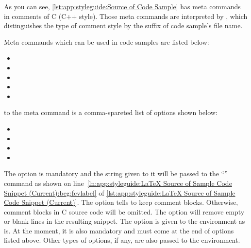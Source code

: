As you can see, \cref{lst:app:styleguide:Source of Code Sample}
has meta commands in comments of C (C++ style).
Those meta commands are interpreted by ,
which distinguishes the type of comment style by the suffix of code
sample's file name.

Meta commands which can be used in code samples are listed below:

\begin{itemize}[noitemsep]
\item {}
\item {}
\item {}
\item \co{\\fcvexclude}
\item \co{\\fcvblank}
\end{itemize}

 to the  meta command
is a comma-spareted list of options shown below:

\begin{itemize}[noitemsep]
\item {}
\item {}
\item {}
\item {}
\end{itemize}

The  option is mandatory and the string given to it
will be passed to the
``'' command as shown on
line~\ref{ln:app:styleguide:LaTeX Source of Sample Code Snippet (Current):beg:fcvlabel} of
\cref{lst:app:styleguide:LaTeX Source of Sample Code Snippet (Current)}.
The  option tells  to keep
comment blocks.
Otherwise, comment blocks in C source code will be omitted.
The  option will remove empty or blank lines
in the resulting snippet.
The  option is given to the  environment
as is.
At the moment, it is also mandatory and must come at the end of options
listed above.
Other types of options, if any, are also passed to the 
environment.

